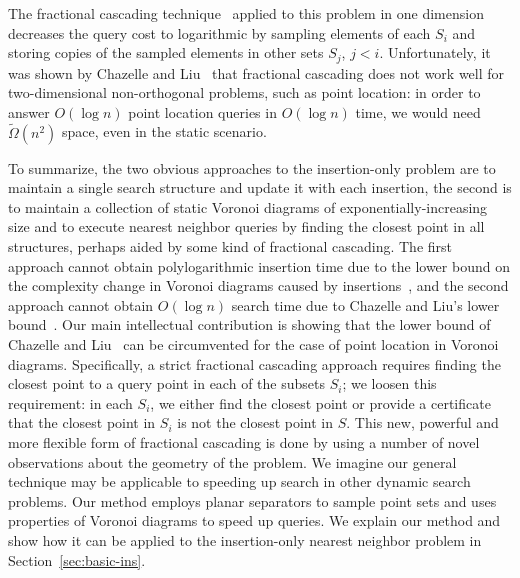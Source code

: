 \documentclass[10pt,a4paper]{amsart}
\newif\ifarxiv
\newif\ifsocg
\newcommand{\eps}{\varepsilon}
\begin{document}
The fractional cascading technique~\cite{ChazelleG86} applied to this problem in one dimension decreases the query cost to logarithmic by sampling elements of each $S_i$ and storing copies of the  sampled elements in other sets $S_j$, $j<i$. Unfortunately, it was shown by Chazelle and Liu~\cite{ChazelleL04} that fractional cascading does not work well for two-dimensional non-orthogonal problems, such as point location:  in order to answer $O(\log n)$ point location queries in $O(\log n)$ time, we would need $\tilde{\Omega}(n^2)$ space, even in the static scenario.

To summarize, the two obvious approaches to the insertion-only problem are to maintain a single search structure and update it with each insertion, the second is to maintain a collection of static Voronoi diagrams of exponentially-increasing size and to execute nearest neighbor queries by finding the closest point in all structures, perhaps aided by some kind of fractional cascading. The first approach cannot obtain polylogarithmic insertion time due to the lower bound on the complexity change in Voronoi diagrams caused by insertions~\cite{AllenBIL17}, and the second approach cannot obtain $O(\log n)$ search time due to Chazelle and Liu's lower bound~\cite{ChazelleL04}.
Our main intellectual contribution is showing that the lower bound of Chazelle and Liu~\cite{ChazelleL04} can be circumvented for  the case of point location in Voronoi diagrams. Specifically, a strict fractional cascading approach requires finding the closest point to a query point in each of the subsets $S_i$; we loosen this requirement: in each $S_i$, we either find the closest point or provide a certificate that the closest point in $S_i$ is not the closest point in $S$. This new, powerful and more flexible form of fractional cascading is done by  using a number of novel observations about the geometry of the problem.
 We imagine our general technique may be applicable to speeding up search in other dynamic search problems.
Our method employs planar separators to sample point sets and uses properties of Voronoi diagrams to speed up queries. We explain our method and show how it can be applied to the insertion-only nearest neighbor problem in Section~\ref{sec:basic-ins}. 
\ifarxiv
A further modification of our method that improves the insertion time and the space usage is described in Section~\ref{sec:ins-faster}. We describe a partially persistent data structure in Section~\ref{sec:persist}.  A semi-online data structure is described in Section~\ref{sec:offline}. 
\fi
\ifsocg
A further modification of our method, that will be described in the full version of this paper,   improves the insertion time and the insertion time  to $O(\log^{1+\eps}n)$ and space usage to $O(n)$. The description of partially persistent and semi-online data structures is also deferred to the full version. 
\fi
\end{document}
